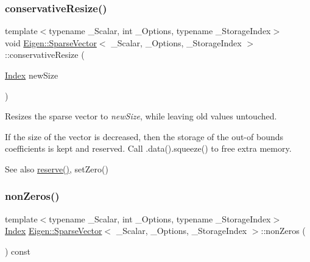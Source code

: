 \subsubsection{\texorpdfstring{conservativeResize()}{conservativeResize()}}
{\footnotesize\ttfamily template$<$typename \+\_\+\+Scalar, int \+\_\+\+Options, typename \+\_\+\+Storage\+Index$>$ \\
void \mbox{\hyperlink{class_eigen_1_1_sparse_vector}{Eigen\+::\+Sparse\+Vector}}$<$ \+\_\+\+Scalar, \+\_\+\+Options, \+\_\+\+Storage\+Index $>$\+::conservative\+Resize (\begin{DoxyParamCaption}\item[{\mbox{\hyperlink{struct_eigen_1_1_eigen_base_a554f30542cc2316add4b1ea0a492ff02}{Index}}}]{new\+Size }\end{DoxyParamCaption})\hspace{0.3cm}{\ttfamily [inline]}}

Resizes the sparse vector to {\itshape new\+Size}, while leaving old values untouched.

If the size of the vector is decreased, then the storage of the out-\/of bounds coefficients is kept and reserved. Call .data().squeeze() to free extra memory.

\begin{DoxySeeAlso}{See also}
\mbox{\hyperlink{class_eigen_1_1_sparse_vector_a594675dd305845e55edcab61c1b21d33}{reserve()}}, set\+Zero() 
\end{DoxySeeAlso}
\mbox{\label{class_eigen_1_1_sparse_vector_aeaa74603bb1405f622726907795c9b5a}} 
\subsubsection{\texorpdfstring{nonZeros()}{nonZeros()}}
{\footnotesize\ttfamily template$<$typename \+\_\+\+Scalar, int \+\_\+\+Options, typename \+\_\+\+Storage\+Index$>$ \\
\mbox{\hyperlink{struct_eigen_1_1_eigen_base_a554f30542cc2316add4b1ea0a492ff02}{Index}} \mbox{\hyperlink{class_eigen_1_1_sparse_vector}{Eigen\+::\+Sparse\+Vector}}$<$ \+\_\+\+Scalar, \+\_\+\+Options, \+\_\+\+Storage\+Index $>$\+::non\+Zeros (\begin{DoxyParamCaption}{ }\end{DoxyParamCaption}) const\hspace{0.3cm}{\ttfamily [inline]}}

